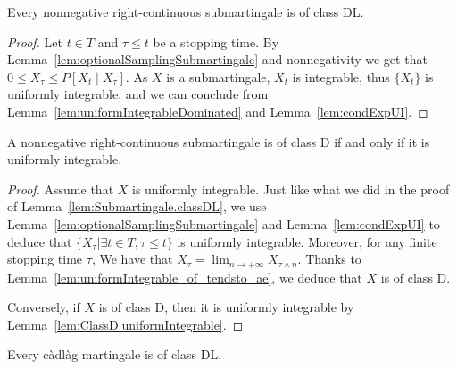 \begin{lemma}\label{lem:Submartingale.classDL}
Every nonnegative right-continuous submartingale is of class DL.
\end{lemma}

\begin{proof}
Let $t \in T$ and $\tau \le t$ be a stopping time. By Lemma~\ref{lem:optionalSamplingSubmartingale} and nonnegativity we get that $0 \le X_\tau \le P[X_t \mid X_\tau]$. As $X$ is a submartingale, $X_t$ is integrable, thus $\{X_t\}$ is uniformly integrable, and we can conclude from Lemma~\ref{lem:uniformIntegrableDominated} and Lemma~\ref{lem:condExpUI}.
\end{proof}


\begin{lemma}\label{lem:Submartingale.classD_iff_uniformIntegrable}
A nonnegative right-continuous submartingale is of class D if and only if it is uniformly integrable.
\end{lemma}

\begin{proof}
Assume that $X$ is uniformly integrable. Just like what we did in the proof of Lemma~\ref{lem:Submartingale.classDL}, we use Lemma~\ref{lem:optionalSamplingSubmartingale} and Lemma~\ref{lem:condExpUI} to deduce that $\{X_\tau|\exists t\in T, \tau\le t\}$ is uniformly integrable. Moreover, for any finite stopping time $\tau$, We have that $X_\tau = \lim_{n \to +\infty} X_{\tau \land n}$. Thanks to Lemma~\ref{lem:uniformIntegrable_of_tendsto_ae}, we deduce that $X$ is of class D.

Conversely, if $X$ is of class D, then it is uniformly integrable by Lemma~\ref{lem:ClassD.uniformIntegrable}.
\end{proof}


\begin{lemma}\label{lem:Martingale.classDL}
Every càdlàg martingale is of class DL.
\end{lemma}


